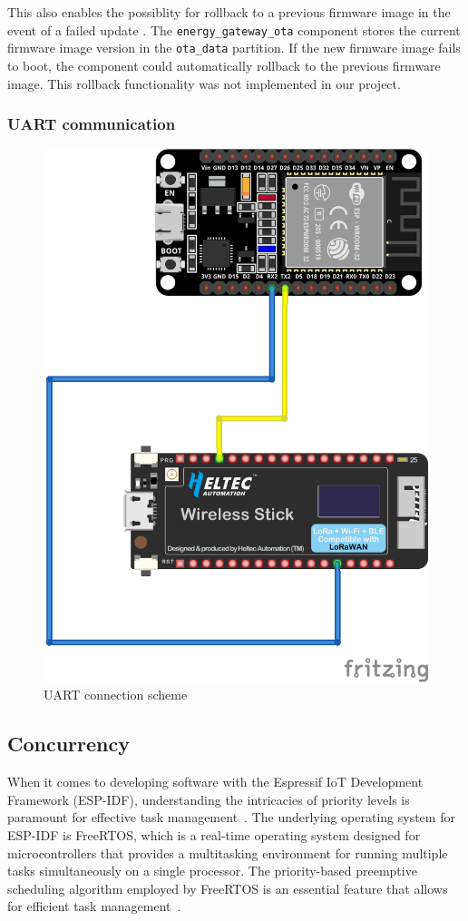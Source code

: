 This also enables the possiblity for rollback to a previous firmware image in the event of a failed update \cite{espressif:esp-idf-programming-guide}. The \texttt{energy\_gateway\_ota} component stores the current firmware image version in the \texttt{ota\_data} partition. If the new firmware image fails to boot, the component could automatically rollback to the previous firmware image. This rollback functionality was not implemented in our project.

\subsubsection{UART communication}

\begin{figure}[ht]
  \centering
  \includegraphics[width=0.8\linewidth]{figures/uart_connection.png}
  \caption{UART connection scheme}
  \label{fig:uart_connection}
\end{figure}

\subsection{Concurrency}

When it comes to developing software with the Espressif IoT Development Framework (ESP-IDF), understanding the intricacies of priority levels is paramount for effective task management~\cite{Davis:2016}. The underlying operating system for ESP-IDF is FreeRTOS, which is a real-time operating system designed for microcontrollers that provides a multitasking environment for running multiple tasks simultaneously on a single processor. The priority-based preemptive scheduling algorithm employed by FreeRTOS is an essential feature that allows for efficient task management~\cite{espressif:esp-idf-programming-guide}.

